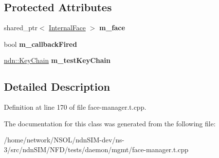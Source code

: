 \subsection*{Protected Attributes}
\begin{DoxyCompactItemize}
\item 
shared\+\_\+ptr$<$ \hyperlink{classnfd_1_1InternalFace}{Internal\+Face} $>$ {\bfseries m\+\_\+face}\hypertarget{classnfd_1_1tests_1_1TestFaceManagerCommon_a3a31f94e25c3e877b0e58e624f6c6e8a}{}\label{classnfd_1_1tests_1_1TestFaceManagerCommon_a3a31f94e25c3e877b0e58e624f6c6e8a}

\item 
bool {\bfseries m\+\_\+callback\+Fired}\hypertarget{classnfd_1_1tests_1_1TestFaceManagerCommon_a27a903bde44c08ba9613042cfc952110}{}\label{classnfd_1_1tests_1_1TestFaceManagerCommon_a27a903bde44c08ba9613042cfc952110}

\item 
\hyperlink{classndn_1_1security_1_1KeyChain}{ndn\+::\+Key\+Chain} {\bfseries m\+\_\+test\+Key\+Chain}\hypertarget{classnfd_1_1tests_1_1TestFaceManagerCommon_a64885d7b871c41a8965a53acc4918ff7}{}\label{classnfd_1_1tests_1_1TestFaceManagerCommon_a64885d7b871c41a8965a53acc4918ff7}

\end{DoxyCompactItemize}


\subsection{Detailed Description}


Definition at line 170 of file face-\/manager.\+t.\+cpp.



The documentation for this class was generated from the following file\+:\begin{DoxyCompactItemize}
\item 
/home/network/\+N\+S\+O\+L/ndn\+S\+I\+M-\/dev/ns-\/3/src/ndn\+S\+I\+M/\+N\+F\+D/tests/daemon/mgmt/face-\/manager.\+t.\+cpp\end{DoxyCompactItemize}

